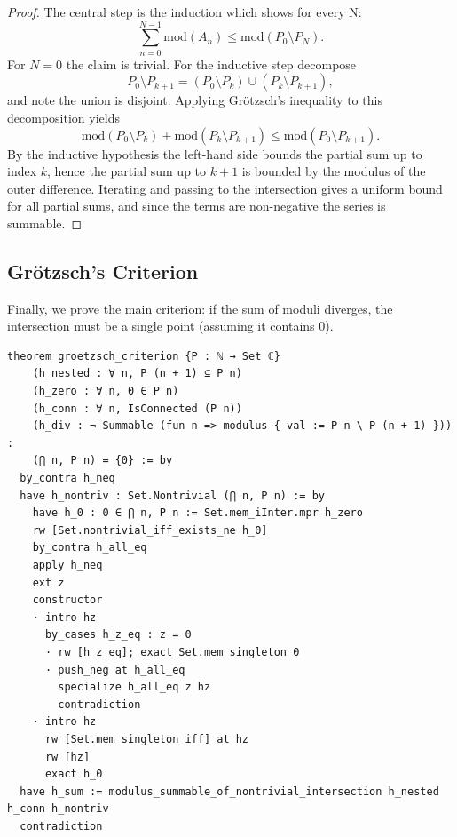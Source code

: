 \begin{proof}
The central step is the induction which shows for every N:
\[
\sum_{n=0}^{N-1}\mathrm{mod}(A_n)\le\mathrm{mod}(P_0\setminus P_N).
\]
For $N=0$ the claim is trivial. For the inductive step decompose
\[
P_0\setminus P_{k+1}=(P_0\setminus P_k)\cup(P_k\setminus P_{k+1}),
\]
and note the union is disjoint. Applying Grötzsch's inequality to this decomposition yields
\[
\mathrm{mod}(P_0\setminus P_k)+\mathrm{mod}(P_k\setminus P_{k+1})\le\mathrm{mod}(P_0\setminus P_{k+1}).
\]
By the inductive hypothesis the left-hand side bounds the partial sum up to index $k$, hence the partial sum up to $k+1$ is bounded by the modulus of the outer difference. Iterating and passing to the intersection gives a uniform bound for all partial sums, and since the terms are non-negative the series is summable.
\end{proof}

\subsection{Grötzsch's Criterion}

Finally, we prove the main criterion: if the sum of moduli diverges, the intersection must be a single point (assuming it contains 0).

\begin{lstlisting}[language=Lean]
theorem groetzsch_criterion {P : ℕ → Set ℂ}
    (h_nested : ∀ n, P (n + 1) ⊆ P n)
    (h_zero : ∀ n, 0 ∈ P n)
    (h_conn : ∀ n, IsConnected (P n))
    (h_div : ¬ Summable (fun n => modulus { val := P n \ P (n + 1) })) :
    (⋂ n, P n) = {0} := by
  by_contra h_neq
  have h_nontriv : Set.Nontrivial (⋂ n, P n) := by
    have h_0 : 0 ∈ ⋂ n, P n := Set.mem_iInter.mpr h_zero
    rw [Set.nontrivial_iff_exists_ne h_0]
    by_contra h_all_eq
    apply h_neq
    ext z
    constructor
    · intro hz
      by_cases h_z_eq : z = 0
      · rw [h_z_eq]; exact Set.mem_singleton 0
      · push_neg at h_all_eq
        specialize h_all_eq z hz
        contradiction
    · intro hz
      rw [Set.mem_singleton_iff] at hz
      rw [hz]
      exact h_0
  have h_sum := modulus_summable_of_nontrivial_intersection h_nested h_conn h_nontriv
  contradiction
\end{lstlisting}

